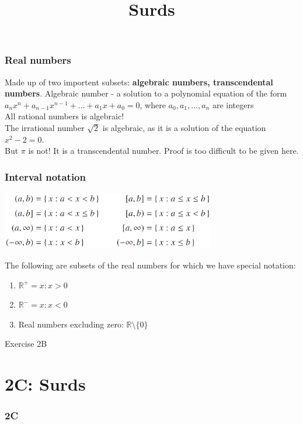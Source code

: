 \documentclass[
	11pt, %
]{beamer}
\begin{document}
\begin{frame}
    \frametitle{Real numbers}
    Made up of two importent subsets: \textbf{algebraic numbers, transcendental numbers}.
    Algebraic number - a solution to a polynomial equation of the form\\
    $a_nx^n + a_{n-1}x^{n-1} + ... + a_1x+a_0 = 0$, where $a_0, a_1, ..., a_n$ are integers\\
    All rational numbers is algebraic!\\
    \bigskip
    The irrational number $\sqrt{2}$ is algebraic, as it is a solution of the equation $x^2 - 2 = 0.$\\
    But $\pi$ is not! It is a transcendental number. Proof is too difficult to be given here.
\end{frame}

\begin{frame}
    \frametitle{Interval notation}
    \begin{center}
        \includegraphics[width=0.7\textwidth]{Interval.png}\\
    \end{center}
    The following are subsets of the real numbers for which we have special notation:\\
    \begin{enumerate}
        \item $\mathbb{R}^+ = {x: x>0}$
        \item $\mathbb{R}^- = {x: x<0}$
        \item Real numbers excluding zero: $\mathbb{R}\setminus$$\{0\}$
    \end{enumerate}
\end{frame}
\begin{frame}{Exercise 2B}
\end{frame}
\section{2C: Surds}
\begin{frame} 
    \frametitle{2C}
    \begin{center}
        \title{Surds}
        \maketitle
    \end{center}
\end{frame}
\end{document}
